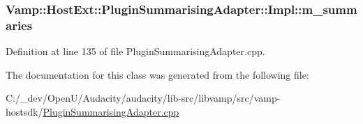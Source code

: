 \subsubsection[{\texorpdfstring{m\+\_\+summaries}{m_summaries}}]{ Vamp\+::\+Host\+Ext\+::\+Plugin\+Summarising\+Adapter\+::\+Impl\+::m\+\_\+summaries\hspace{0.3cm}{\ttfamily [protected]}}\hypertarget{class_vamp_1_1_host_ext_1_1_plugin_summarising_adapter_1_1_impl_afff5c7cea6fd61260bbf001c9b77c936}{}\label{class_vamp_1_1_host_ext_1_1_plugin_summarising_adapter_1_1_impl_afff5c7cea6fd61260bbf001c9b77c936}


Definition at line 135 of file Plugin\+Summarising\+Adapter.\+cpp.



The documentation for this class was generated from the following file\+:\begin{DoxyCompactItemize}
\item 
C\+:/\+\_\+dev/\+Open\+U/\+Audacity/audacity/lib-\/src/libvamp/src/vamp-\/hostsdk/\hyperlink{_plugin_summarising_adapter_8cpp}{Plugin\+Summarising\+Adapter.\+cpp}\end{DoxyCompactItemize}
